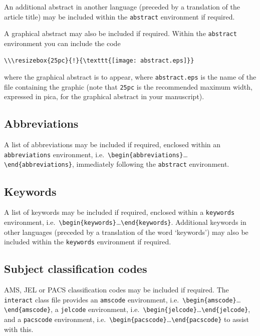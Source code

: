 \documentclass[]{interact}
\theoremstyle{plain}%
\theoremstyle{definition}
\theoremstyle{remark}
\begin{document}
An additional abstract in another language (preceded by a translation of the article title) may be included within the \verb"abstract" environment if required.

A graphical abstract may also be included if required. Within the \verb"abstract" environment you can include the code
\begin{verbatim}
\\\resizebox{25pc}{!}{\texttt{[image: abstract.eps]}}
\end{verbatim}
where the graphical abstract is to appear, where \verb"abstract.eps" is the name of the file containing the graphic (note that \verb"25pc" is the recommended maximum width, expressed in pica, for the graphical abstract in your manuscript).


\subsection{Abbreviations}

A list of abbreviations may be included if required, enclosed within an \texttt{abbreviations} environment, i.e.\ \verb"\begin{abbreviations}"\ldots\verb"\end{abbreviations}", immediately following the \verb"abstract" environment.


\subsection{Keywords}

A list of keywords may be included if required, enclosed within a \texttt{keywords} environment, i.e.\ \verb"\begin{keywords}"\ldots\verb"\end{keywords}". Additional keywords in other languages (preceded by a translation of the word `keywords') may also be included within the \verb"keywords" environment if required.


\subsection{Subject classification codes}

AMS, JEL or PACS classification codes may be included if required. The \texttt{interact} class file provides an \texttt{amscode} environment, i.e.\ \verb"\begin{amscode}"\ldots\verb"\end{amscode}", a \texttt{jelcode} environment, i.e.\ \verb"\begin{jelcode}"\ldots\verb"\end{jelcode}", and a \texttt{pacscode} environment, i.e.\ \verb"\begin{pacscode}"\ldots\verb"\end{pacscode}" to assist with this.
\end{document}
